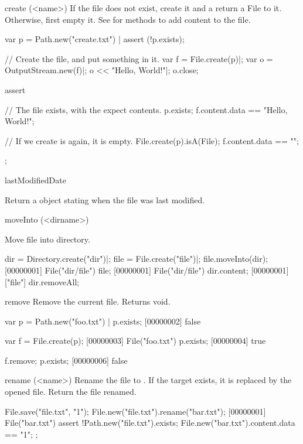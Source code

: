\begin{urbiscriptapi}
\item[create](<name>)%
  If the file  does not exist, create it and a return a File to
  it.  Otherwise, first empty it.  See  for methods
  to add content to the file.
\begin{urbiscript}
var p = Path.new("create.txt") |
assert (!p.exists);

// Create the file, and put something in it.
var f = File.create(p)|;
var o = OutputStream.new(f)|;
o << "Hello, World!"|;
o.close;

assert
{
  // The file exists, with the expect contents.
  p.exists;
  f.content.data == "Hello, World!";

  // If we create is again, it is empty.
  File.create(p).isA(File);
  f.content.data == "";
};
\end{urbiscript}


\item[lastModifiedDate]
  \experimental{}

  Return a  object stating when the file was last modified.


\item[moveInto](<dirname>)
  \experimental{}

  Move file into  directory.
\begin{urbiscript}
dir = Directory.create("dir")|;
file = File.create("file")|;
file.moveInto(dir);
[00000001] File("dir/file")
file;
[00000001] File("dir/file")
dir.content;
[00000001] ["file"]
dir.removeAll;
\end{urbiscript}


\item[remove]
  Remove the current file.  Returns void.
\begin{urbiscript}[firstnumber=1]
var p = Path.new("foo.txt") |
p.exists;
[00000002] false

var f = File.create(p);
[00000003] File("foo.txt")
p.exists;
[00000004] true

f.remove;
p.exists;
[00000006] false
\end{urbiscript}


\item[rename](<name>)%
  Rename the file to .  If the target exists, it is replaced by
  the opened file. Return the file renamed.
\begin{urbiscript}
File.save("file.txt", "1\n");
File.new("file.txt").rename("bar.txt");
[00000001] File("bar.txt")
assert
{
  !Path.new("file.txt").exists;
  File.new("bar.txt").content.data == "1\n";
};
\end{urbiscript}



\end{urbiscriptapi}
